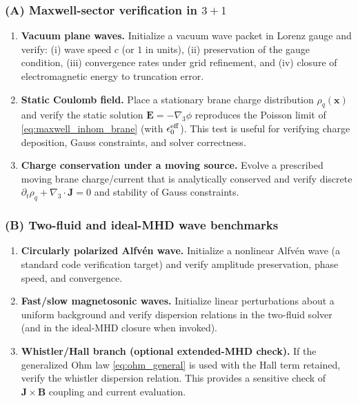 \documentclass[11pt]{article}
\newcommand{\x}{\mathbf{x}}     %
\newcommand{\gradthree}{\nabla_3}
\newcommand{\E}{\mathbf{E}}
\begin{document}
\subsubsection*{(A) Maxwell-sector verification in \(3+1\)}
\begin{enumerate}[leftmargin=1.6em]
\item \textbf{Vacuum plane waves.}
Initialize a vacuum wave packet in Lorenz gauge and verify:
(i) wave speed \(c\) (or \(1\) in units),
(ii) preservation of the gauge condition,
(iii) convergence rates under grid refinement, and
(iv) closure of electromagnetic energy to truncation error.

\item \textbf{Static Coulomb field.}
Place a stationary brane charge distribution \(\rho_q(\x)\) and verify the static
solution \(\E=-\gradthree \phi\) reproduces the Poisson limit of
\eqref{eq:maxwell_inhom_brane} (with \(\epsilon_0^{\rm eff}\)). This test is
useful for verifying charge deposition, Gauss constraints, and solver correctness.

\item \textbf{Charge conservation under a moving source.}
Evolve a prescribed moving brane charge/current that is analytically conserved and
verify discrete \(\partial_t\rho_q+\gradthree\cdot\mathbf{J}=0\) and stability of
Gauss constraints.
\end{enumerate}

\subsubsection*{(B) Two-fluid and ideal-MHD wave benchmarks}
\begin{enumerate}[leftmargin=1.6em]
\item \textbf{Circularly polarized Alfv\'en wave.}
Initialize a nonlinear Alfv\'en wave (a standard code verification target) and
verify amplitude preservation, phase speed, and convergence.

\item \textbf{Fast/slow magnetosonic waves.}
Initialize linear perturbations about a uniform background and verify dispersion
relations in the two-fluid solver (and in the ideal-MHD closure when invoked).

\item \textbf{Whistler/Hall branch (optional extended-MHD check).}
If the generalized Ohm law \eqref{eq:ohm_general} is used with the Hall term retained,
verify the whistler dispersion relation. This provides a sensitive check of
\(\mathbf{J}\times\mathbf{B}\) coupling and current evaluation.
\end{enumerate}
\end{document}
